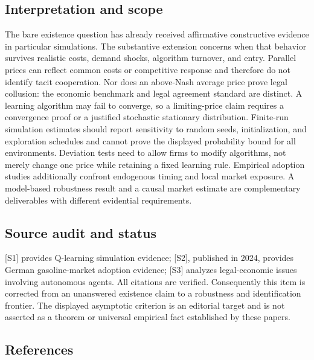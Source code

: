 \documentclass[11pt,a4paper]{article}
\begin{document}
\subsection*{Interpretation and scope}

The bare existence question has already received affirmative constructive evidence in particular simulations. The substantive extension concerns when that behavior survives realistic costs, demand shocks, algorithm turnover, and entry. Parallel prices can reflect common costs or competitive response and therefore do not identify tacit cooperation. Nor does an above-Nash average price prove legal collusion: the economic benchmark and legal agreement standard are distinct. A learning algorithm may fail to converge, so a limiting-price claim requires a convergence proof or a justified stochastic stationary distribution. Finite-run simulation estimates should report sensitivity to random seeds, initialization, and exploration schedules and cannot prove the displayed probability bound for all environments. Deviation tests need to allow firms to modify algorithms, not merely change one price while retaining a fixed learning rule. Empirical adoption studies additionally confront endogenous timing and local market exposure. A model-based robustness result and a causal market estimate are complementary deliverables with different evidential requirements.

\subsection*{Source audit and status}

[S1] provides Q-learning simulation evidence; [S2], published in 2024, provides German gasoline-market adoption evidence; [S3] analyzes legal-economic issues involving autonomous agents. All citations are verified. Consequently this item is corrected from an unanswered existence claim to a robustness and identification frontier. The displayed asymptotic criterion is an editorial target and is not asserted as a theorem or universal empirical fact established by these papers.

\subsection*{References}
\end{document}

